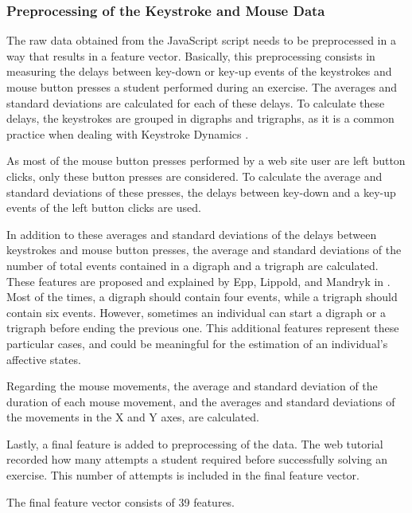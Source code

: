 \documentclass[runningheads,a4paper]{llncs}
\begin{document}
\subsubsection{Preprocessing of the Keystroke and Mouse Data}

The raw data obtained from the JavaScript script needs to be preprocessed in a way that results in a feature vector. Basically, this preprocessing consists in measuring the delays between key-down or key-up events of the keystrokes and mouse button presses a student performed during an exercise. The averages and standard deviations are calculated for each of these delays. To calculate these delays, the keystrokes are grouped in digraphs and trigraphs, as it is a common practice when dealing with Keystroke Dynamics \cite{digraph-trigraph}.

As most of the mouse button presses performed by a web site user are left button clicks, only these button presses are considered. To calculate the average and standard deviations of these presses, the delays between key-down and a key-up events of the left button clicks are used.

In addition to these averages and standard deviations of the delays between keystrokes and mouse button presses, the average and standard deviations of the number of total events contained in a digraph and a trigraph are calculated. These features are proposed and explained by Epp, Lippold, and Mandryk in \cite{keystroke-dynamics1}. Most of the times, a digraph should contain four events, while a trigraph should contain six events. However, sometimes an individual can start a digraph or a trigraph before ending the previous one. This additional features represent these particular cases, and could be meaningful for the estimation of an individual's affective states.

Regarding the mouse movements, the average and standard deviation of the duration of each mouse movement, and the averages and standard deviations of the movements in the X and Y axes, are calculated.

Lastly, a final feature is added to preprocessing of the data. The web tutorial recorded how many attempts a student required before successfully solving an exercise. This number of attempts is included in the final feature vector.

The final feature vector consists of 39 features.
\end{document}
